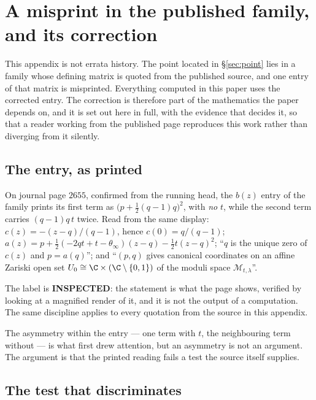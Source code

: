 \section{A misprint in the published family, and its correction}\label{app:typo}

This appendix is not errata history. The point located in \S\ref{sec:point}
lies in a family whose defining matrix is quoted from the published source, and
one entry of that matrix is misprinted. Everything computed in this paper uses
the corrected entry. The correction is therefore part of the mathematics the
paper depends on, and it is set out here in full, with the evidence that
decides it, so that a reader working from the published page reproduces this
work rather than diverging from it silently.

\subsection{The entry, as printed}\label{ssec:typo-printed}

\begin{remark}
On journal page $2655$, confirmed from the running head, the $b(z)$ entry of
the family prints its first term as
$\bigl(p+\tfrac12(q-1)q\bigr)^{2}$, with \emph{no} $t$, while the second term
carries $(q-1)q\,t$ twice. Read from the same display: $c(z)=-(z-q)/(q-1)$,
hence $c(0)=q/(q-1)$; $a(z)=p+\tfrac12(-2qt+t-\theta_\infty)(z-q)-\tfrac12
t(z-q)^{2}$; ``$q$ is the unique zero of $c(z)$ and $p=a(q)$''; and
``$(p,q)$ gives canonical coordinates on an affine Zariski open set
$U_0\cong\C\times(\C\setminus\{0,1\})$ of the moduli space
$\mathcal M_{t,\lambda}$''.
\end{remark}

The label is \textbf{INSPECTED}: the statement is what the page shows, verified
by looking at a magnified render of it, and it is not the output of a
computation. The same discipline applies to every quotation from the source in
this appendix.

The asymmetry within the entry --- one term with $t$, the neighbouring term
without --- is what first drew attention, but an asymmetry is not an argument.
The argument is that the printed reading fails a test the source itself
supplies.

\subsection{The test that discriminates}\label{ssec:typo-test}

